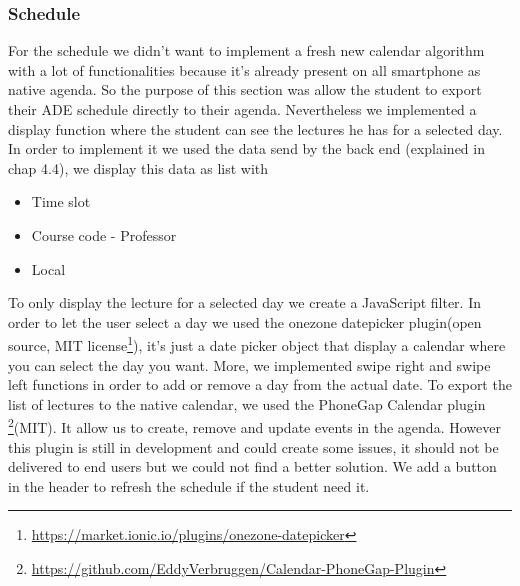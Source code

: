 \documentclass[11pt, a4paper]{report}
\begin{document}
\subsubsection{Schedule}
For the schedule we didn't want to implement a fresh new calendar algorithm with a lot of functionalities because it's already present on all smartphone as native agenda. So the purpose of this section was allow the student to export their ADE schedule directly to their agenda. Nevertheless we implemented a display function where the student can see the lectures he has for a selected day. In order to implement it we used the data send by the back end (explained in chap 4.4), we display this data as list with
\begin{itemize}
\item Time slot
\item Course code - Professor
\item Local
\end{itemize}
To only display the lecture for a selected day we create a JavaScript filter. In order to let the user select a day we used the onezone datepicker plugin(open source, MIT license\footnote{\url{https://market.ionic.io/plugins/onezone-datepicker}}), it's just a date picker object that display a calendar where you can select the day you want. More, we implemented swipe right and swipe left functions in order to add or remove a day from the actual date.
To export the list of lectures to the native calendar, we used the PhoneGap Calendar plugin \footnote{\url{https://github.com/EddyVerbruggen/Calendar-PhoneGap-Plugin}}(MIT). It allow us to create, remove and update events in the agenda. However this plugin is still in development and could create some issues, it should not be delivered to end users but we could not find a better solution. We add a button in the header to refresh the schedule if the student need it. 
\end{document}
